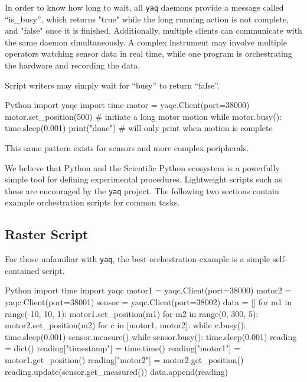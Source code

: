 \documentclass[11pt, full]{article}
\newcommand\yaq{\texttt{yaq}}
\begin{document}
In order to know how long to wait, all \yaq{} daemons provide a message called “is\_busy”, which returns "true" while the long running action is not complete, and "false" once it is finished.
Additionally, multiple clients can communicate with the same daemon simultaneously. A complex instrument may involve multiple operators watching sensor data in real time, while one program is orchestrating the hardware and recording the data.

Script writers may simply wait for ``busy'' to return ``false''.

\begin{codefragment}{Python}
import yaqc
import time
motor = yaqc.Client(port=38000)
motor.set_position(500)  # initiate a long motor motion
while motor.busy():
    time.sleep(0.001)
print("done")  # will only print when motion is complete
\end{codefragment}

This same pattern exists for sensors and more complex peripherals.


We believe that Python and the Scientific Python ecosystem is a powerfully simple tool for defining experimental procedures.
Lightweight scripts such as these are encouraged by the \yaq{} project.
The following two sections contain example orchestration scripts for common tasks.

\clearpage
\subsection{Raster Script}

For those unfamiliar with \yaq{}, the best orchestration example is a simple self-contained script.

\begin{codefragment}{Python}
import time
import yaqc
motor1 = yaqc.Client(port=38000)
motor2 = yaqc.Client(port=38001)
sensor = yaqc.Client(port=38002)
data = []
for m1 in range(-10, 10, 1):
    motor1.set_position(m1)
    for m2 in range(0, 300, 5):
        motor2.set_position(m2)
        for c in [motor1, motor2]:
            while c.busy():
                time.sleep(0.001)
        sensor.measure()
        while sensor.busy():
            time.sleep(0.001)
        reading = dict()
        reading["timestamp"] = time.time()
        reading["motor1"] = motor1.get_position()
        reading["motor2"] = motor2.get_position()
        reading.update(sensor.get_measured())
        data.append(reading)
\end{codefragment}
\end{document}
